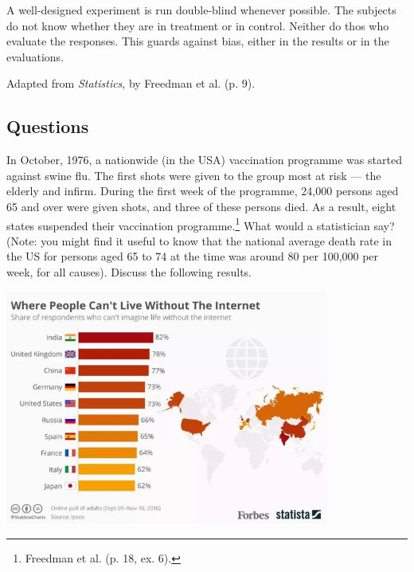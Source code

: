 A well-designed experiment is run double-blind whenever possible. The subjects do not know whether they are in treatment or in control.
Neither do thos who evaluate the responses. This guards against bias, either in the results or in the evaluations.

\begin{flushright}
  Adapted from \textit{Statistics}, by Freedman et al. (p. 9).
\end{flushright}


\clearpage
\subsection*{Questions}
\begin{questions}
  \question In October, 1976, a nationwide (in the USA) vaccination programme was started against swine flu. The first shots were given to the group
            most at risk --- the elderly and infirm. During the first week of the programme, 24,000 persons aged 65 and over were given shots,
            and three of these persons died. As a result, eight states suspended their vaccination programme.\footnote{Freedman et al. (p. 18, ex. 6).}
            What would a statistician say? (Note: you might find it useful to know that the national average death rate in the US for persons aged 65
            to 74 at the time was around 80 per 100,000 per week, for all causes).
  \question Discuss the following results.
            \begin{center}
              \includegraphics[width=0.8\textwidth]{badsurvey}
            \end{center}
\end{questions}

